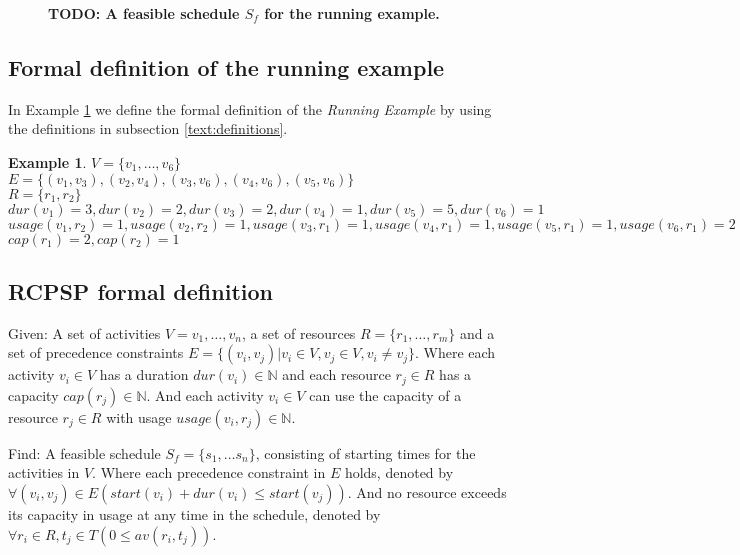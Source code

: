 \documentclass{article}
\theoremstyle{definition}
\newcommand{\inputtikz}[1]{}
\newcommand{\TODO}[1]{{\color{red}\textbf{TODO: #1}}}
\newtheorem{example}{Example}[section]
\newcommand{\av}[2]{\ensuremath{av(r_{#1}, t_{#2})}} %
\newcommand{\capa}[1]{\ensuremath{cap(r_{#1})}} %
\newcommand{\dur}[1]{\ensuremath{dur(v_{#1})}} %
\newcommand{\usage}[2]{\ensuremath{usage(v_{#1}, r_{#2})}} %
\newcommand{\start}[1]{\ensuremath{start(v_{#1})}} %
\newenvironment{definition}[1][Definition]{\begin{trivlist}
\item[\hskip \labelsep {\bfseries #1}]}{\end{trivlist}}
\begin{document}
\begin{figure}[h]
	\centering
	\inputtikz{schedule_comparison}
	\caption{\TODO{A feasible schedule $S_f$ for the running example.} }
	\label{fig:feasible_schedule}
\end{figure}

\subsection{Formal definition of the running example}

In Example \ref{exmp:running} we define the formal definition of the \emph{Running Example} by using the definitions in subsection \ref{text:definitions}.
\begin{example}
\label{exmp:running}
$V = \{v_1, \ldots, v_6\}$\\
$E = \{(v_1, v_3), (v_2, v_4), (v_3, v_6), (v_4, v_6), (v_5, v_6)\}$\\
$R = \{r_1, r_2\}$\\
$\dur{1} = 3, \dur{2} = 2, \dur{3} = 2, \dur{4} = 1, \dur{5} = 5, \dur{6} = 1$\\
$\usage{1}{2} = 1, \usage{2}{2} = 1, \usage{3}{1} = 1, \usage{4}{1} = 1, \usage{5}{1} = 1, \usage{6}{1} = 2$\\
$\capa{1} = 2, \capa{2} = 1$
\end{example}


\subsection{RCPSP formal definition}

\begin{definition}
Given:
A set of activities $V = v_1, \ldots, v_n$, a set of resources $R = \{r_1, \ldots, r_m\}$ and a set of precedence constraints $E =  \{(v_i, v_j) | v_i \in V, v_j \in V, v_i \neq v_j\}$.
Where each activity $v_i \in V$ has a duration $\dur{i} \in \mathbb{N}$ and each resource $r_j \in R$ has a capacity $\capa{j} \in \mathbb{N}$. 
And each activity $v_i \in V$ can use the capacity of a resource $r_j \in R$ with usage $\usage{i}{j} \in \mathbb{N}$.

Find:
A feasible schedule $S_f = \{s_1, \ldots s_n\}$, consisting of starting times for the activities in $V$.
Where each precedence constraint in $E$ holds, denoted by $\forall (v_i, v_j) \in E (\start{i} + \dur{i} \leq \start{j})$.
And no resource exceeds its capacity in usage at any time in the schedule, denoted by $\forall r_i \in R, t_j \in T (0 \leq \av{i}{j})$.
\end{definition}
\end{document}
